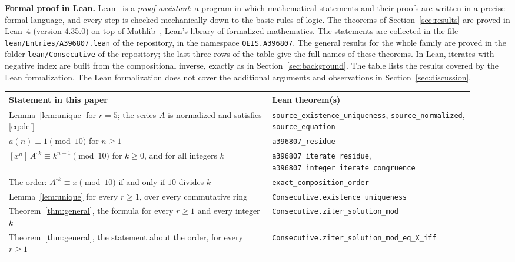 \documentclass[11pt,a4paper]{article}
\theoremstyle{definition}
\theoremstyle{remark}
\newcommand{\coeff}[2]{[x^{#1}]\,#2}
\newcommand{\para}[1]{\par\medskip\noindent\textbf{#1}\enspace}
\begin{document}
\para{Formal proof in Lean.}
Lean~\cite{lean} is a \emph{proof assistant}: a program in which mathematical statements and their proofs are written
in a precise formal language, and every step is checked mechanically down to the basic rules of logic. The theorems of Section~\ref{sec:results} are proved in Lean~4 (version 4.35.0) on top of
Mathlib~\cite{mathlib}, Lean's library of formalized mathematics. The statements are collected in the file \texttt{lean/Entries/A396807.lean} of the repository,
in the namespace \texttt{OEIS.A396807}. The general results for the whole family are proved in the folder \texttt{lean/Consecutive} of the
repository; the last three rows of the table give the full names of these theorems. In Lean, iterates with negative index are built from the
compositional inverse, exactly as in Section~\ref{sec:background}.
The table lists the results covered by the Lean formalization. The Lean formalization does not cover the additional arguments and observations in Section~\ref{sec:discussion}.
\begin{center}\small\renewcommand{\arraystretch}{1.25}
\begin{tabular}{>{\raggedright\arraybackslash}p{0.52\linewidth}>{\raggedright\arraybackslash}p{0.4\linewidth}}
\toprule
Statement in this paper & Lean theorem(s)\\
\midrule
Lemma~\ref{lem:unique} for $r=5$; the series $A$ is normalized and satisfies \eqref{eq:def} & \texttt{source\_\allowbreak{}existence\_\allowbreak{}uniqueness}, \texttt{source\_\allowbreak{}normalized}, \texttt{source\_\allowbreak{}equation} \\
$a(n)\equiv1\pmod{10}$ for $n\ge1$ & \texttt{a396807\_\allowbreak{}residue} \\
$\coeff{n}{A^{\circ k}}\equiv k^{n-1}\pmod{10}$ for $k\ge0$, and for all integers $k$ & \texttt{a396807\_\allowbreak{}iterate\_\allowbreak{}residue}, \texttt{a396807\_\allowbreak{}integer\_\allowbreak{}iterate\_\allowbreak{}congruence} \\
The order: $A^{\circ k}\equiv x\pmod{10}$ if and only if $10$ divides $k$ & \texttt{exact\_\allowbreak{}composition\_\allowbreak{}order} \\
Lemma~\ref{lem:unique} for every $r\ge1$, over every commutative ring & \texttt{Consecutive.existence\_\allowbreak{}uniqueness} \\
Theorem~\ref{thm:general}, the formula for every $r\ge1$ and every integer $k$ & \texttt{Consecutive.ziter\_\allowbreak{}solution\_\allowbreak{}mod} \\
Theorem~\ref{thm:general}, the statement about the order, for every $r\ge1$ & \texttt{Consecutive.ziter\_\allowbreak{}solution\_\allowbreak{}mod\_\allowbreak{}eq\_\allowbreak{}X\_\allowbreak{}iff} \\
\bottomrule
\end{tabular}
\end{center}
\end{document}
